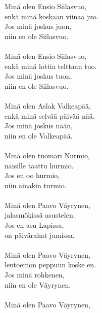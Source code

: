 
            Minä olen Ensio Siilasvuo, \\
            enkä minä koskaan viinaa juo. \\
            Jos minä joskus juon, \\
            niin en ole Siilasvuo. \\
\hspace{10mm} \\
            Minä olen Ensio Siilasvuo, \\
            enkä minä lottia telttaan tuo. \\
            Jos minä joskus tuon, \\
            niin en ole Siilasvuo. \\
\hspace{10mm} \\
            Minä olen Aslak Valkeapää, \\
            enkä minä selvää päivää nää. \\
            Jos minä joskus nään, \\
            niin en ole Valkeapää. \\
\hspace{10mm} \\
            Minä olen tuomari Nurmio, \\
            naisille taattu hurmio. \\
            Jos en oo hurmio, \\
            niin ainakin turmio. \\
\hspace{10mm} \\
            Minä olen Paavo Väyrynen, \\
            jalasmökissä asustelen. \\
            Jos en asu Lapissa, \\
            on päivärahat jumissa. \\
\hspace{10mm} \\
            Minä olen Paavo Väyrynen, \\
            lentoemon peppuun koske en. \\
            Jos minä rohkenen, \\
            niin en ole Väyrynen. \\
\hspace{10mm} \\
            Minä olen Paavo Väyrynen, \\
